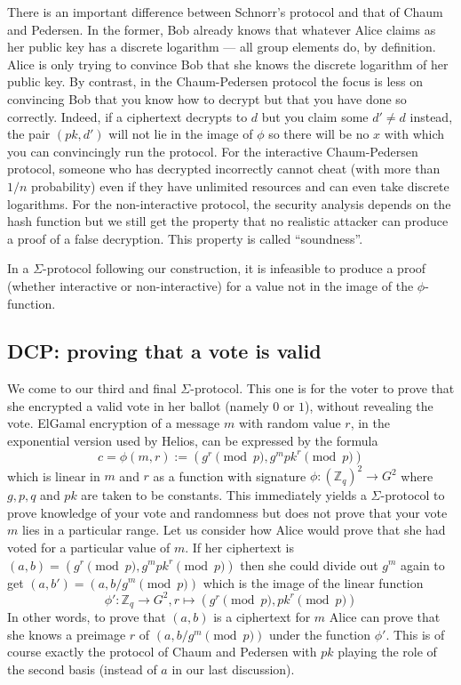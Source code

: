 \documentclass[envcountsame]{llncs}
\begin{document}
There is an important difference between Schnorr's protocol and that of Chaum
and Pedersen. In the former, Bob already knows that whatever Alice claims as her
public key has a discrete logarithm --- all group elements do, by definition.
Alice is only trying to convince Bob that she knows the discrete logarithm of
her public key.
By contrast, in the Chaum-Pedersen protocol the focus is less on convincing Bob
that you know how to decrypt but that you have done so correctly. Indeed, if a
ciphertext decrypts to $d$ but you claim some $d' \neq d$ instead, the pair
$(pk, d')$ will not lie in the image of $\phi$ so there will be no $x$ with
which you can convincingly run the protocol. For the interactive Chaum-Pedersen
protocol, someone who has decrypted incorrectly cannot cheat (with more than
$1/n$ probability) even if they have unlimited resources and can even take
discrete logarithms. For the non-interactive protocol, the security analysis
depends on the hash function but we still get the property that no realistic
attacker can produce a proof of a false decryption. This property is called
``soundness''.

\begin{proposition}
In a $\Sigma$-protocol following our construction, it is infeasible to produce a
proof (whether interactive or non-interactive) for a value not in the image of
the $\phi$-function.
\end{proposition}

\subsection{DCP: proving that a vote is valid}

We come to our third and final $\Sigma$-protocol. This one is for the voter to
prove that she encrypted a valid vote in her ballot (namely $0$ or $1$), without
revealing the vote. ElGamal encryption of a message $m$ with random value $r$,
in the exponential version used by Helios, can be expressed by the formula
\[
c = \phi(m, r) := (g^r \pmod{p}, g^m pk^r \pmod{p})
\]
which is linear in $m$ and $r$ as a function with signature 
$\phi: (\mathbb Z_q)^2 \to G^2$ 
where $g, p, q$ and $pk$ are taken to be constants.
This immediately yields a $\Sigma$-protocol to prove knowledge of your vote and
randomness but does not prove that your vote $m$ lies in a particular range.
Let us consider how Alice would prove that she had voted for a particular value
of $m$. If her ciphertext is $(a, b) = (g^r \pmod{p}, g^m pk^r \pmod{p})$ then
she could divide out $g^m$ again to get $(a, b') = (a, b/g^m \pmod{p})$ which
is the image of the linear function
\[
\phi': \mathbb Z_q \to G^2, r \mapsto (g^r \pmod{p}, pk^r \pmod{p})
\]
In other words, to prove that $(a, b)$ is a ciphertext for $m$ Alice can prove
that she knows a preimage $r$ of $(a, b/g^m \pmod{p})$ under the function
$\phi'$. This is of course exactly the protocol of Chaum and Pedersen with $pk$
playing the role of the second basis (instead of $a$ in our last discussion).
\end{document}
